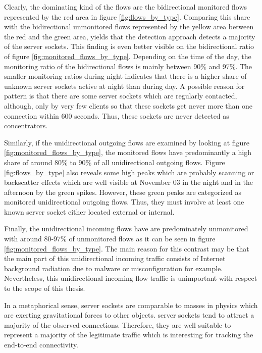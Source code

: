 Clearly, the dominating kind of the flows are the bidirectional monitored flows
represented by the red area in figure \ref{fig:flows_by_type}. Comparing this
share with the bidirectional unmonitored flows represented by the yellow area
between the red and the green area, yields that the detection approach detects a
majority of the \glspl{server socket}. This finding is even better visible on
the bidirectional ratio of figure \ref{fig:monitored_flows_by_type}. Depending
on the time of the day, the monitoring ratio of the bidirectional flows is
mainly between 90\% and 97\%.
The smaller monitoring ratios during night indicates that there is a higher
share of unknown \glspl{server socket} active at night than during day.
A possible reason for pattern is that there are some
\glspl{server socket} which are regularly contacted, although, only by very few
clients so that these sockets get never more than one connection within 600
seconds. Thus, these sockets are never detected as concentrators.

Similarly, if the unidirectional outgoing flows are examined by looking at
figure \ref{fig:monitored_flows_by_type}, the monitored flows have predominantly
a high share of around 80\% to 90\% of all unidirectional outgoing flows. Figure
\ref{fig:flows_by_type} also reveals some high peaks which are probably scanning
or backscatter effects which are well visible at November 03 in the night and in
the afternoon by the green spikes. However, these green peaks are categorized as
monitored unidirectional outgoing flows. Thus, they must involve at least one
known \gls{server socket} either located external or internal.

Finally, the unidirectional incoming flows have are predominately unmonitored
with around 80-97\% of unmonitored flows as it can be seen in figure
\ref{fig:monitored_flows_by_type}. The main reason for this contrast may be that
the main part of this unidirectional incoming traffic consists of Internet
background radiation \citep{Wustrow10,Pang04} due to malware or misconfiguration
for example. Nevertheless, this unidirectional incoming flow traffic is
unimportant with respect to the scope of this thesis.

In a metaphorical sense, \glspl{server socket} are comparable to masses in
physics which are exerting gravitational forces to other objects. \Glspl{server
socket} tend to attract a majority of the observed connections. Therefore, they
are well suitable to represent a majority of the legitimate traffic which is
interesting for tracking the end-to-end connectivity.

